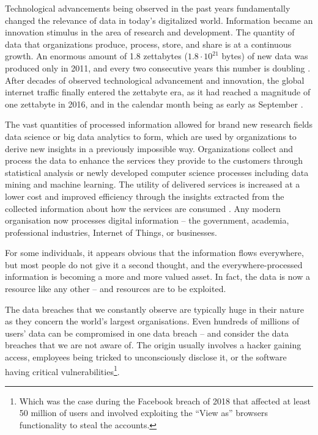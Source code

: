 \documentclass[a4paper,twoside,12pt]{book}
\begin{document}
Technological advancements being observed in the past years fundamentally changed the relevance of data in today's digitalized world. Information became an innovation stimulus in the area of research and development. The quantity of data that organizations produce, process, store, and share is at a continuous growth. An enormous amount of 1.8 zettabytes ($1.8 \cdot 10^{21}$ bytes) of new data was produced only in 2011, and every two consecutive years this number is doubling \cite{bib:big_data_security}. After decades of observed technological advancement and innovation, the global internet traffic finally entered the zettabyte era, as it had reached a magnitude of one zettabyte in 2016, and in the calendar month being as early as September \cite{bib:cisco_blog}.

The vast quantities of processed information allowed for brand new research fields data science or big data analytics to form, which are used by organizations to derive new insights in a previously impossible way. Organizations collect and process the data to enhance the services they provide to the customers through statistical analysis or newly developed computer science processes including data mining and machine learning. The utility of delivered services is increased at a lower cost and improved efficiency through the insights extracted from the collected information about how the services are consumed \cite{bib:anonymization_pipeline}. Any modern organisation now processes digital information -- the government, academia, professional industries, Internet of Things, or businesses.


For some individuals, it appears obvious that the information flows everywhere, but most people do not give it a second thought, and the everywhere-processed information is becoming a more and more valued asset. In fact, the data is now a resource like any other -- and resources are to be exploited.


The data breaches that we constantly observe \cite{bib:gdpr_handbook} are typically huge in their nature as they concern the world's largest organisations. Even hundreds of millions of users' data can be compromised in one data breach -- and consider the data breaches that we are not aware of. The origin usually involves a hacker gaining access, employees being tricked to unconsciously disclose it, or the software having critical vulnerabilities\footnote{Which was the case during the Facebook breach of 2018 that affected at least 50 million of users and involved exploiting the ``View as'' browsers functionality to steal the accounts.}.
\end{document}
